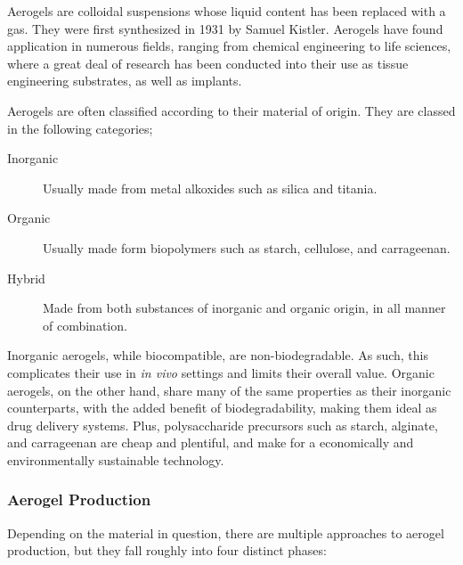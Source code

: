 \documentclass[a4paper,12pt]{article}
\begin{document}
Aerogels are colloidal suspensions whose liquid content has been replaced with a gas. They were first synthesized in 1931 by Samuel Kistler.\supercite{ulker_emerging_2014} Aerogels have found application in numerous fields, ranging from chemical engineering to life sciences, where a great deal of research has been conducted into their use as tissue engineering substrates, as well as implants.\supercite{stergar_review_2016} 

Aerogels are often classified according to their material of origin. They are classed in the following categories\supercite{stergar_review_2016};

\begin{description}
	\item [Inorganic] Usually made from metal alkoxides such as silica and titania.
	\item [Organic] Usually made form biopolymers such as starch, cellulose, and carrageenan.
	\item [Hybrid] Made from both substances of inorganic and organic origin, in all manner of combination.

\end{description}

Inorganic aerogels, while biocompatible, are non-biodegradable. As such, this complicates
their use in \textit{in vivo} settings and limits their overall value. Organic aerogels, on the other hand, share many of the same properties as their inorganic counterparts, with the added benefit of biodegradability, making them ideal as drug delivery systems.\supercite{ulker_emerging_2014} Plus, polysaccharide precursors such as starch, alginate, and carrageenan are cheap and plentiful, and make for a economically and environmentally sustainable technology.\supercite{garcia-gonzalez_polysaccharide-based_2011} 

\subsubsection{Aerogel Production}

Depending on the material in question, there are multiple approaches to aerogel production, but they fall roughly into four distinct phases\supercite{ulker_emerging_2014}:
\end{document}
